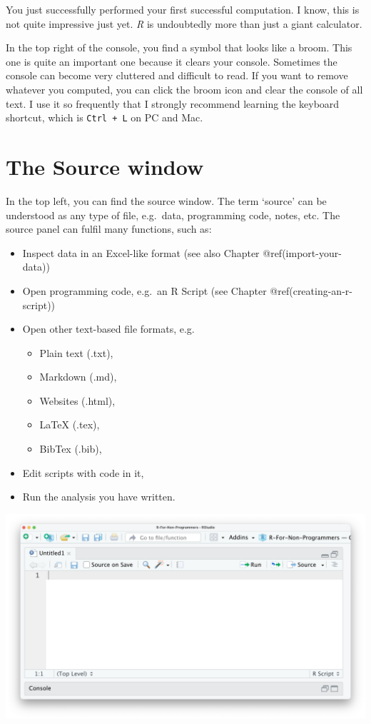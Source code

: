 \documentclass[
  letterpaper,
]{krantz}
\begin{document}
You just successfully performed your first successful computation. I
know, this is not quite impressive just yet. \emph{R} is undoubtedly
more than just a giant calculator.

In the top right of the console, you find a symbol that looks like a
broom. This one is quite an important one because it clears your
console. Sometimes the console can become very cluttered and difficult
to read. If you want to remove whatever you computed, you can click the
broom icon and clear the console of all text. I use it so frequently
that I strongly recommend learning the keyboard shortcut, which is
\texttt{Ctrl\ +\ L} on PC and Mac.

\section{The Source window}\label{the-source-window}

In the top left, you can find the source window. The term `source' can
be understood as any type of file, e.g.~data, programming code, notes,
etc. The source panel can fulfil many functions, such as:

\begin{itemize}
\item
  Inspect data in an Excel-like format (see also Chapter
  @ref(import-your-data))
\item
  Open programming code, e.g.~an R Script (see Chapter
  @ref(creating-an-r-script))
\item
  Open other text-based file formats, e.g.

  \begin{itemize}
  \item
    Plain text (.txt),
  \item
    Markdown (.md),
  \item
    Websites (.html),
  \item
    LaTeX (.tex),
  \item
    BibTex (.bib),
  \end{itemize}
\item
  Edit scripts with code in it,
\item
  Run the analysis you have written.
\end{itemize}

\includegraphics{images/chapter_04_img/03_source_window/01_rstudio_source.png}
\end{document}
